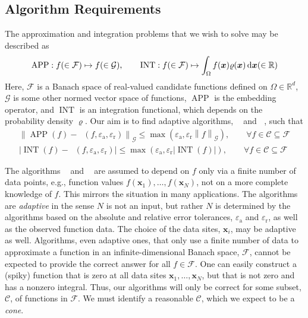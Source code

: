 \documentclass[11pt]{NSFamsart}
\def\reals{{\mathbb{R}}}
\DeclareMathOperator{\APP}{APP}
\DeclareMathOperator{\INT}{INT}
\DeclareMathOperator{\hAPP}{\widehat{\APP}}
\DeclareMathOperator{\hINT}{\widehat{\INT}}
\newcommand{\bx}{{\boldsymbol{x}}}
\def\dif{\textup{d}}
\newcommand{\calc}{{\mathcal{C}}}
\newcommand{\calf}{{\mathcal{F}}}
\newcommand{\calg}{{\mathcal{G}}}
\def\abs#1{\ensuremath{\left \lvert #1 \right \rvert}}
\newcommand{\norm}[2][{}]{\ensuremath{\left \lVert #2 \right \rVert}_{#1}}
\newcommand{\abstol}{\varepsilon_{\text{a}}}
\newcommand{\reltol}{\varepsilon_{\text{r}}}
\begin{document}
\subsection*{Algorithm Requirements} The approximation and integration problems that we wish to solve may be described as 
\begin{equation}
\APP: f (\in \calf) \mapsto f (\in \calg), \qquad \INT: f (\in \calf) \mapsto \int_{\Omega} f(\bx) \varrho(\bx) \, \dif \bx (\in \reals)
\end{equation}
Here, $\calf$ is a Banach space of real-valued candidate functions defined on $\Omega \in \reals^d$, $\calg$ is some other normed vector space of functions, $\APP$ is the embedding operator, and $\INT$ is an integration functional, which depends on the probability density $\varrho$.  Our aim is to find adaptive algorithms, $\hAPP$ and $\hINT$, such that 
\begin{subequations} \label{adaptalgoerr}
\begin{gather}
\label{hAPPerr}
\norm[\calg]{\APP(f)-\hAPP(f,\abstol,\reltol)} \le \max(\abstol,\reltol \norm[\calg]{f}), \qquad \forall f \in \calc \subseteq \calf\\
\label{hINTerr}
\abs{\INT(f) -\hINT(f,\abstol,\reltol)} \le \max(\abstol,\reltol \abs{\INT(f)}), \qquad \forall f \in \calc \subseteq \calf
\end{gather}
\end{subequations}

The algorithms $\hAPP$ and $\hINT$ are assumed to depend on $f$ only via a finite number of data points, e.g., function values $f(\bx_1), \ldots, f(\bx_N)$, not on a more complete knowledge of $f$.  This mirrors the situation in many applications.  The algorithms are \emph{adaptive} in the sense $N$ is not an input, but rather $N$ is determined by the algorithms based on the absolute and relative error tolerances, $\abstol$ and $\reltol$, as well as the observed function data.  The choice of the data sites, $\bx_i$, may be adaptive as well.  Algorithms, even adaptive ones, that only use a finite number of data to approximate a function in an infinite-dimensional Banach space, $\calf$, cannot be expected to provide the correct answer for all $f\in \calf$.  One can easily construct a (spiky) function that is zero at all data sites $\bx_1, \ldots, \bx_N$, but that is not zero and has a nonzero integral.  Thus, our algorithms will only be correct for some subset, $\calc$, of functions in $\calf$.  We must identify a reasonable $\calc$, which we expect to be a \emph{cone}.
\end{document}
